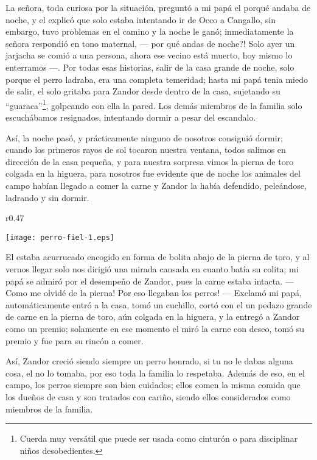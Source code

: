 La señora, toda curiosa por la situación, preguntó a mi papá el porqué andaba de noche, y el explicó que solo estaba intentando ir de Occo a Cangallo, sin embargo, tuvo problemas en el camino y la noche le ganó; inmediatamente la señora respondió en tono maternal, --- por qué andas de noche?! Solo ayer un jarjacha se comió a una persona, ahora ese vecino está muerto, hoy mismo lo enterramos ---.
Por todas esas historias, salir de la casa grande de noche, solo porque el perro ladraba, era una completa temeridad; hasta mi papá tenia miedo de salir, el solo gritaba para Zandor desde dentro de la casa, sujetando su ``guaraca''\footnote{Cuerda muy versátil que puede ser usada como cinturón o para disciplinar niños desobedientes.}, golpeando con ella la pared.
Los demás miembros de la familia solo escuchábamos resignados, intentando dormir a pesar del escandalo.

Así, la noche pasó, y prácticamente ninguno de nosotros consiguió dormir; cuando los primeros rayos de sol tocaron nuestra ventana, todos salimos en dirección de la casa pequeña, y para nuestra sorpresa vimos la pierna de toro colgada en la higuera, para nosotros fue evidente que de noche los animales del campo habían llegado a comer la carne y Zandor la había defendido, peleándose, ladrando y sin dormir. 
\begin{wrapfigure}{r}{0.47\textwidth}
  \begin{center}
  \vspace{-0.5cm}
    \texttt{[image: perro-fiel-1.eps]}
  \end{center}
  \vspace{-0.5cm}
\end{wrapfigure}
El estaba acurrucado encogido en forma de bolita abajo de la pierna de toro, y al vernos llegar solo nos dirigió una mirada cansada en cuanto batía su colita; mi papá se admiró por el desempeño de Zandor, pues la carne estaba intacta. --- Como me olvidé de la pierna! Por eso llegaban los perros! ---
Exclamó mi papá, automáticamente entró a la casa, tomó un cuchillo, cortó con el un pedazo grande de carne en la pierna de toro, aún colgada en la higuera, y la entregó a Zandor como un premio; solamente en ese momento el miró la carne con deseo, tomó su premio y fue para su rincón a comer.

Así, Zandor creció siendo siempre un perro honrado, si tu no le dabas alguna cosa, el no lo tomaba, por eso toda la familia lo respetaba. Además de eso, en el campo, los perros siempre son bien cuidados; ellos comen la misma comida que los dueños de casa y son tratados con cariño, siendo ellos considerados como miembros de la familia.


